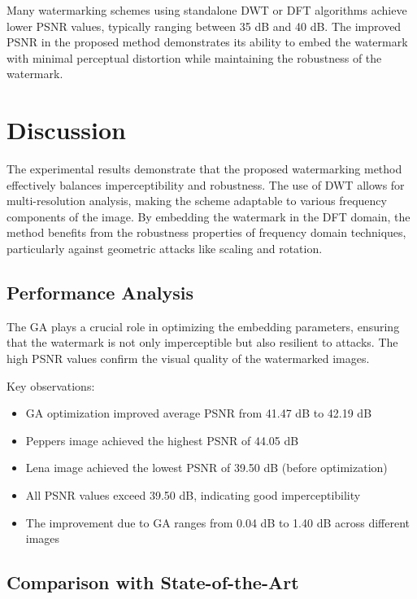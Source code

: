 Many watermarking schemes using standalone DWT or DFT algorithms achieve lower PSNR values, typically ranging between 35 dB and 40 dB. The improved PSNR in the proposed method demonstrates its ability to embed the watermark with minimal perceptual distortion while maintaining the robustness of the watermark.

\section{Discussion}

The experimental results demonstrate that the proposed watermarking method effectively balances imperceptibility and robustness. The use of DWT allows for multi-resolution analysis, making the scheme adaptable to various frequency components of the image. By embedding the watermark in the DFT domain, the method benefits from the robustness properties of frequency domain techniques, particularly against geometric attacks like scaling and rotation.

\subsection{Performance Analysis}

The GA plays a crucial role in optimizing the embedding parameters, ensuring that the watermark is not only imperceptible but also resilient to attacks. The high PSNR values confirm the visual quality of the watermarked images. 

Key observations:

\begin{itemize}
    \item GA optimization improved average PSNR from 41.47 dB to 42.19 dB
    \item Peppers image achieved the highest PSNR of 44.05 dB
    \item Lena image achieved the lowest PSNR of 39.50 dB (before optimization)
    \item All PSNR values exceed 39.50 dB, indicating good imperceptibility
    \item The improvement due to GA ranges from 0.04 dB to 1.40 dB across different images
\end{itemize}

\subsection{Comparison with State-of-the-Art}

